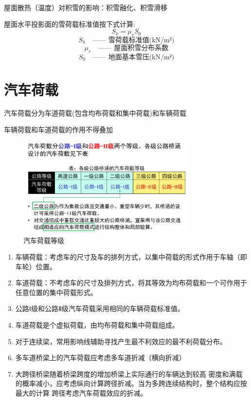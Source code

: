 \documentclass[12pt, a4paper, oneside, UTF8]{ctexbook}
\begin{document}
屋面散热（温度）对积雪的影响：积雪融化、积雪滑移

\begin{definition}
    屋面水平投影面的雪荷载标准值按下式计算:
\[ S_k = \mu_r S_0 \]
\[ S_k \quad \text{—— 雪荷载标准值(kN/m²)} \]
\[ \mu_r \quad \text{—— 屋面积雪分布系数} \]
\[ S_0 \quad \text{—— 地面基本雪压(kN/m²)} \]
\end{definition}

\section{汽车荷载}

\begin{definition}
    汽车荷载分为车道荷载(包含均布荷载和集中荷载)和车辆荷载
\end{definition}

\begin{remark}
    车辆荷载和车道荷载的作用不得叠加
\end{remark}

\begin{figure}[H]
    \centering
    \includegraphics[width=0.8\textwidth]{../figure/qichehezai.png}
    \caption{汽车荷载等级}
    \label{fig:qichehezai}
\end{figure}

\begin{enumerate}
    \item 车辆荷载：考虑车的尺寸及车的排列方式，以集中荷载的形式作用于车轴（即车轮）位置。
    \item 车道荷载：不考虑车的尺寸及排列方式，将其等效为均布荷载和一个可作用于任意位置的集中荷载形式。
    \item 公路Ⅰ级和公路Ⅱ级汽车荷载采用相同的车辆荷载标准值。
    \item 车道荷载是个虚拟荷载，由均布荷载和集中荷载组成。
    \item 对于连续梁，常用影响线辅助寻找产生最不利效应的最不利荷载分布。
    \item 多车道桥梁上的汽车荷载应考虑多车道折减（横向折减）
    \item 大跨径桥梁随着桥梁跨度的增加桥梁上实际通行的车辆达到较高
    密度和满载的概率减小，应考虑纵向计算跨径折减。当为多跨连续结构时，整个结构应按最大的计算
    跨径考虑汽车荷载效应的折减。
\end{enumerate}
\end{document}
